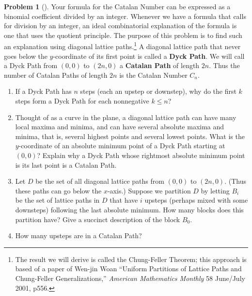 \documentclass[10pt,]{book}
\newcommand{\terminology}[1]{\textbf{#1}}
\theoremstyle{plain}
\theoremstyle{definition}
\newtheorem{activity}[project]{Problem}
\theoremstyle{definition}
\numberwithin{equation}{chapter}
\newcommand{\importantarrow}{\Rightarrow}
\begin{document}
\begin{activity}[]\marginsymbol[-1em]{\pdftooltip{$\importantarrow$}{especially interesting}} \label{activity-52}
Your formula for the Catalan Number can be expressed as a binomial coefficient divided by an integer. Whenever we have a formula that calls for division by an integer, an ideal combinatorial explanation of the formula is one that uses the quotient principle. The purpose of this problem is to find such an explanation using diagonal lattice paths.\footnote{The result we will derive is called the Chung-Feller Theorem; this approach is based of a paper of Wen-jin Woan ``Uniform Partitions of Lattice Paths and Chung-Feller Generalizations,'' \textsl{American Mathematics Monthly} 58 June/July 2001, p556.\label{fn-3}} A diagonal lattice path that never goes below the \(y\)-coordinate of its first point is called a \terminology{Dyck Path}. We will call a Dyck Path from \((0,0)\) to \((2n,0)\) a \terminology{Catalan Path} of length \(2n\). Thus the number of Catalan Paths of length \(2n\) is the Catalan Number \(C_n\).%
\begin{enumerate}[font=\bfseries,label=(\alph*),ref=\alph*]
\item\label{task-59} \marginsymbol[-2.5em]{} If a Dyck Path has \(n\) steps (each an upstep or downstep), why do the first \(k\) steps form a Dyck Path for each nonnegative \(k\le n\)?%
\item\label{task-60} \marginsymbol[-2.5em]{} Thought of as a curve in the plane, a diagonal lattice path can have many local maxima and minima, and can have several absolute maxima and minima, that is, several highest points and several lowest points. What is the \(y\)-coordinate of an absolute minimum point of a Dyck Path starting at \((0,0)\)?  Explain why a Dyck Path whose rightmost absolute minimum point is its last point is a Catalan Path.%
\item\label{task-61} \marginsymbol[-2.5em]{} Let \(D\) be the set of all diagonal lattice paths from \((0,0)\) to \((2n,0)\).  (Thus these paths can go below the \(x\)-axis.) Suppose we partition \(D\) by letting \(B_i\) be the set of lattice paths in \(D\) that have \(i\) upsteps (perhaps mixed with some downsteps) following the last absolute minimum.  How many blocks does this partition have?  Give a succinct description of the block \(B_0\).%
\item\label{task-62} \marginsymbol[-2.5em]{} How many upsteps are in a Catalan Path?%

\end{enumerate}
\end{activity}
\end{document}
